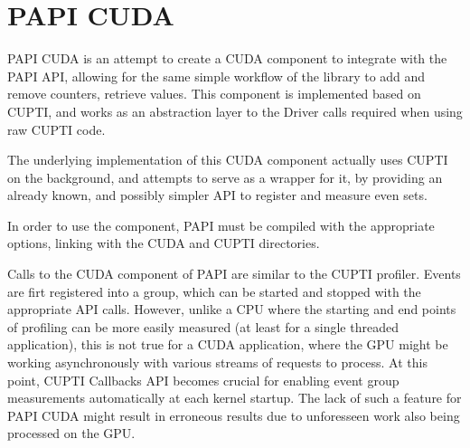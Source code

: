 \section{PAPI CUDA}
\label{sec:papi-cuda}

PAPI CUDA is an attempt to create a CUDA component to integrate with the PAPI API, allowing for the same simple workflow of the library to add and remove counters, retrieve values. This component is implemented based on CUPTI, and works as an abstraction layer to the Driver calls required when using raw CUPTI code.

The underlying implementation of this CUDA component actually uses CUPTI on the background, and attempts to serve as a wrapper for it, by providing an already known, and possibly simpler API to register and measure even sets.

In order to use the component, PAPI must be compiled with the appropriate options, linking with the CUDA and CUPTI directories.

Calls to the CUDA component of PAPI are similar to the CUPTI profiler. Events are firt registered into a group, which can be started and stopped with the appropriate API calls. However, unlike a CPU where the starting and end points of profiling can be more easily measured (at least for a single threaded application), this is not true for a CUDA application, where the GPU might be working asynchronously with various streams of requests to process. At this point, CUPTI Callbacks API becomes crucial for enabling event group measurements automatically at each kernel startup. The lack of such a feature for PAPI CUDA might result in erroneous results due to unforesseen work also being processed on the GPU.